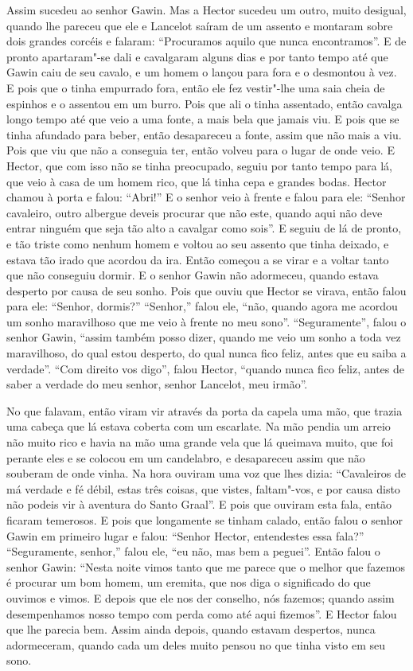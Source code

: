 Assim sucedeu ao senhor Gawin. Mas a Hector sucedeu um outro, muito desigual,
quando lhe pareceu que ele e Lancelot saíram de um assento e montaram sobre
dois grandes corcéis e falaram: “Procuramos aquilo que nunca encontramos”. E de
pronto apartaram"-se dali e cavalgaram alguns dias e por tanto tempo até que
Gawin caiu de seu cavalo, e um homem o lançou para fora e o desmontou à
vez. E pois que o tinha empurrado fora, então ele fez vestir"-lhe uma saia cheia
de espinhos e o assentou em um burro. Pois que ali o tinha assentado, então
cavalga longo tempo até que veio a uma fonte, a mais bela que jamais viu. E
pois que se tinha afundado para beber, então desapareceu a fonte, assim que não
mais a viu. Pois que viu que não a conseguia ter, então volveu para o lugar de
onde veio. E Hector, que com isso não se tinha preocupado, seguiu por tanto
tempo para lá, que veio à casa de um homem rico, que lá tinha cepa e grandes
bodas. Hector chamou à porta e falou: “Abri!” E o senhor veio à frente e falou
para ele: “Senhor cavaleiro, outro albergue deveis procurar que não este,
quando aqui não deve entrar ninguém que seja tão alto a cavalgar como sois”. E
seguiu de lá de pronto, e tão triste como nenhum homem e voltou ao seu assento
que tinha deixado, e estava tão irado que acordou da ira. Então
começou a se virar e a voltar tanto que não conseguiu dormir. E o senhor Gawin
não adormeceu, quando estava desperto por causa de seu sonho. Pois que ouviu
que Hector se virava, então falou para ele: “Senhor, dormis?” “Senhor,” falou
ele, “não, quando agora me acordou um sonho maravilhoso que me veio à frente no
meu sono”. “Seguramente”, falou o senhor Gawin, “assim também posso dizer,
quando me veio um sonho a toda vez maravilhoso, do qual estou desperto, do qual
nunca fico feliz, antes que eu saiba a verdade”. “Com direito vos digo”, falou
Hector, “quando nunca fico feliz, antes de saber a verdade do meu senhor,
senhor Lancelot, meu irmão”.

No que falavam, então viram vir através da porta da capela uma mão, que trazia
uma cabeça que lá estava coberta com um escarlate. Na mão pendia um arreio não
muito rico e havia na mão uma grande vela que lá queimava muito, que foi
perante eles e se colocou em um candelabro, e desapareceu assim que não
souberam de onde vinha. Na hora ouviram uma voz que lhes dizia: “Cavaleiros de
má verdade e fé débil, estas três coisas, que vistes, faltam"-vos, e por causa
disto não podeis vir à aventura do Santo Graal”. E pois que ouviram
esta fala, então ficaram temerosos. E pois que longamente se tinham calado,
então falou o senhor Gawin em primeiro lugar e falou: “Senhor Hector,
entendestes essa fala?” “Seguramente, senhor,” falou ele, “eu não, mas bem a
peguei”. Então falou o senhor Gawin: “Nesta noite vimos tanto que me parece que
o melhor que fazemos é procurar um bom homem, um eremita, que nos diga o
significado do que ouvimos e vimos. E depois que ele nos der conselho, nós
fazemos; quando assim desempenhamos nosso tempo com perda como até aqui
fizemos”. E Hector falou que lhe parecia bem. Assim ainda depois, quando
estavam despertos, nunca adormeceram, quando cada um deles muito pensou no que
tinha visto em seu sono.

